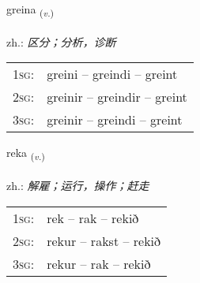 \documentclass[frontgrid, backgrid]{flacards}\usepackage[]{graphicx}\usepackage[]{xcolor}
\begin{document}
\renewcommand{\blhead}{\vskip5pt {\small\bfseries\footnotesize Sagnorð | 动词 }}
\renewcommand{\bcfoot}{\vskip5pt \hspace{2pt}{\small\bfseries\footnotesize 1K}}


{greina \small{\textsubscript{(\textit{v.})}} \\[1ex] %
\textphonetic{[kreiːna]} \\
zh.: \emph{区分；分析，诊断} \\  [2ex]
\renewcommand*{\arraystretch}{0.8}
\begin{tabular}{p{1cm}l}
\textsc{1sg}: & greini -- greindi -- greint \\ 
\textsc{2sg}: & greinir -- greindir -- greint \\ 
\textsc{3sg}: & greinir -- greindi -- greint \\ 
\end{tabular}
}

\renewcommand{\flhead}{\vskip5pt \fboxsep=0pt {\small\bfseries\footnotesize Sagnorð | 动词}}
\renewcommand{\fcfoot}{\vskip5pt \fboxsep=0pt \hspace{2pt}{\small\bfseries\footnotesize 1K}}

\renewcommand{\blhead}{\vskip5pt {\small\bfseries\footnotesize Sagnorð | 动词 }}
\renewcommand{\bcfoot}{\vskip5pt \hspace{2pt}{\small\bfseries\footnotesize 1K}}


{reka \small{\textsubscript{(\textit{v.})}} \\[1ex] %
\textphonetic{[rɛːka]} \\
zh.: \emph{解雇；运行，操作；赶走} \\  [2ex]
\renewcommand*{\arraystretch}{0.8}
\begin{tabular}{p{1cm}l}
\textsc{1sg}: & rek -- rak -- rekið \\ 
\textsc{2sg}: & rekur -- rakst -- rekið \\ 
\textsc{3sg}: & rekur -- rak -- rekið \\ 
\end{tabular}
}
\end{document}
